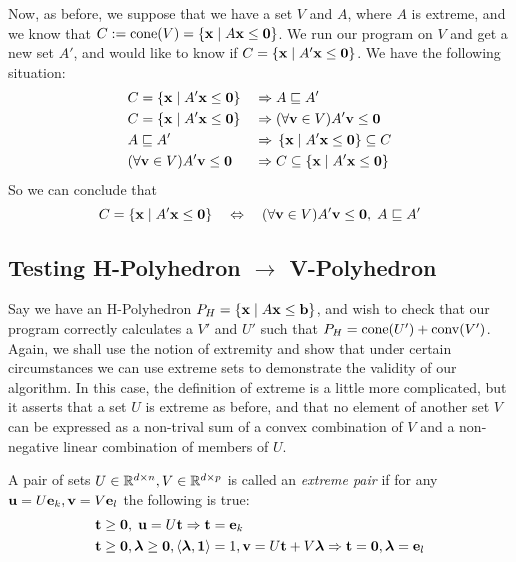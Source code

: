 Now, as before, we suppose that we have a set $V$ and $A$, where $A$ is extreme, and we know that $C := \operatorname{cone}(V) = \left\{\mathbf{x}\;|\; A\mathbf{x}\leq\mathbf{0}\right\}$.  We run our program on $V$ and get a new set $A'$, and would like to know if $C = \left\{\mathbf{x}\;|\; A'\mathbf{x}\leq\mathbf{0}\right\}$.  We have the following situation:
\begin{alignat*}{2}
  &C = \left\{\mathbf{x}\;|\; A'\mathbf{x}\leq\mathbf{0}\right\}    \;&\Rightarrow&\; A \sqsubseteq A' \\
  &C = \left\{\mathbf{x}\;|\; A'\mathbf{x}\leq\mathbf{0}\right\}    \;&\Rightarrow&\; (\forall \mathbf{v}\in V) A'\mathbf{v} \leq \mathbf{0} \\
  &A \sqsubseteq A' \;&\Rightarrow&\; \left\{\mathbf{x}\;|\; A'\mathbf{x}\leq\mathbf{0}\right\} \subseteq C \\
  &(\forall \mathbf{v}\in V) A'\mathbf{v} \leq \mathbf{0}  \;&\Rightarrow&\; C \subseteq \left\{\mathbf{x}\;|\; A'\mathbf{x}\leq\mathbf{0}\right\} 
\end{alignat*}
So we can conclude that
\[ C = \left\{\mathbf{x}\;|\; A'\mathbf{x}\leq\mathbf{0}\right\} \quad\Leftrightarrow\quad 
   (\forall \mathbf{v}\in V)A'\mathbf{v}\leq\mathbf{0},\; A \sqsubseteq A' \]

\subsection{Testing H-Polyhedron $\to$ V-Polyhedron}

Say we have an H-Polyhedron $P_H = \left\{\mathbf{x}\;|\; A\mathbf{x}\leq\mathbf{b}\right\}$, and wish to check that our program correctly calculates a $V'$ and $U'$ such that $P_H = \operatorname{cone}(U') + \operatorname{conv}(V')$.  Again, we shall use the notion of extremity and show that under certain circumstances we can use extreme sets to demonstrate the validity of our algorithm.  In this case, the definition of extreme is a little more complicated, but it asserts that a set $U$ is extreme as before, and that no element of another set $V$ can be expressed as a non-trival sum of a convex combination of $V$ and a non-negative linear combination of members of $U$.

\begin{Def}{ A pair of sets $U\in\mathbb{R}^{d\times n}, V\in\mathbb{R}^{d\times p}$ is called an \textit{extreme pair} if for any $\mathbf{u} = U\mathbf{e}_k, \mathbf{v} = V\mathbf{e}_l$ the following is true:
\begin{alignat*}{1}
   &\mathbf{t} \geq \mathbf{0},\; \mathbf{u} = U\mathbf{t} \Rightarrow \mathbf{t} = \mathbf{e}_k \\
   &\mathbf{t} \geq \mathbf{0}, \bm{\lambda} \geq \mathbf{0}, \left\langle \bm{\lambda}, \mathbf{1} \right\rangle = 1, \mathbf{v} = U\mathbf{t} + V\bm{\lambda} 
                \Rightarrow \mathbf{t} = \mathbf{0}, \bm{\lambda} = \mathbf{e}_l
\end{alignat*}
}\end{Def}

